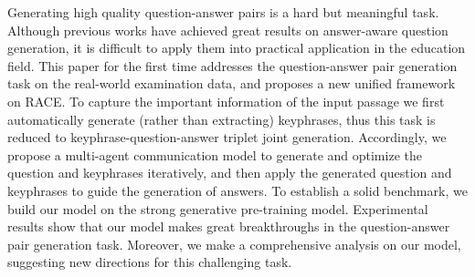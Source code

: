 Generating high quality question-answer pairs is a hard but meaningful task. Although previous works have achieved great results on answer-aware question generation, it is difficult to apply them into practical application in the education field. This paper for the first time addresses the question-answer pair generation task on the real-world examination data, and proposes a new unified framework on RACE. To capture the important information of the input passage we first automatically generate (rather than extracting) keyphrases, thus this task is reduced to keyphrase-question-answer triplet joint generation. Accordingly, we propose a multi-agent communication model to generate and optimize the question and keyphrases iteratively, and then apply the generated question and keyphrases to guide the generation of answers. To establish a solid benchmark, we build our model on the strong generative pre-training model. Experimental results show that our model makes great breakthroughs in the question-answer pair generation task. Moreover, we make a comprehensive analysis on our model, suggesting new directions for this challenging task.
